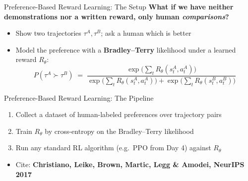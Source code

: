 \begin{frame}{Preference-Based Reward Learning: The Setup}
\textbf{What if we have neither demonstrations nor a written reward, only human \emph{comparisons}?}
\vspace{0.6em}
\begin{itemize}
    \setlength{\itemsep}{0.55em}
    \item Show two trajectories $\tau^A, \tau^B$; ask a human which is better
    \item Model the preference with a \textbf{Bradley--Terry} likelihood under a learned reward $R_\theta$:
    \[
        P(\tau^A \succ \tau^B) \;=\;
        \frac{\exp\!\big(\sum_t R_\theta(s_t^A, a_t^A)\big)}
             {\exp\!\big(\sum_t R_\theta(s_t^A, a_t^A)\big)
            + \exp\!\big(\sum_t R_\theta(s_t^B, a_t^B)\big)}
    \]
\end{itemize}
\end{frame}

\begin{frame}{Preference-Based Reward Learning: The Pipeline}
\begin{enumerate}
    \setlength{\itemsep}{0.6em}
    \item Collect a dataset of human-labeled preferences over trajectory pairs
    \item Train $R_\theta$ by cross-entropy on the Bradley--Terry likelihood
    \item Run any standard RL algorithm (e.g.\ PPO from Day 4) against $R_\theta$
\end{enumerate}
\vspace{0.7em}
\begin{itemize}
    \item Cite: \textbf{Christiano, Leike, Brown, Martic, Legg \& Amodei, NeurIPS 2017}
\end{itemize}
\end{frame}

